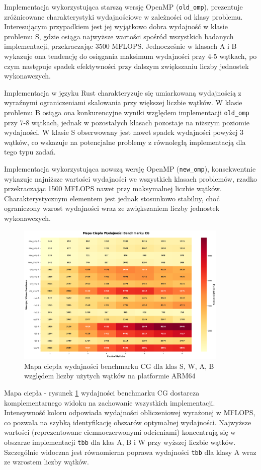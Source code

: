 Implementacja wykorzystująca starszą wersję OpenMP (\texttt{old\_omp}), prezentuje zróżnicowane charakterystyki wydajnościowe w zależności od klasy problemu. Interesującym przypadkiem jest jej wyjątkowo dobra wydajność w klasie problemu S, gdzie osiąga najwyższe wartości spośród wszystkich badanych implementacji, przekraczając 3500 MFLOPS. Jednocześnie w klasach A i B wykazuje ona tendencję do osiągania maksimum wydajności przy 4-5 wątkach, po czym następuje spadek efektywności przy dalszym zwiększaniu liczby jednostek wykonawczych.

Implementacja w języku Rust charakteryzuje się umiarkowaną wydajnością z wyraźnymi ograniczeniami skalowania przy większej liczbie wątków. W klasie problemu B osiąga ona konkurencyjne wyniki względem implementacji \texttt{old\_omp} przy 7-8 wątkach, jednak w pozostałych klasach pozostaje na niższym poziomie wydajności. W klasie S obserwowany jest nawet spadek wydajności powyżej 3 wątków, co wskazuje na potencjalne problemy z równoległą implementacją dla tego typu zadań.

Implementacja wykorzystująca nowszą wersję OpenMP (\texttt{new\_omp}), konsekwentnie wykazuje najniższe wartości wydajności we wszystkich klasach problemów, rzadko przekraczając 1500 MFLOPS nawet przy maksymalnej liczbie wątków. Charakterystycznym elementem jest jednak stosunkowo stabilny, choć ograniczony wzrost wydajności wraz ze zwiększaniem liczby jednostek wykonawczych.

\begin{figure}[H]
    \centering
    \includegraphics[width=0.9\textwidth]{analiza/images/parallel/cg/x86/cg_mapa_ciepla_wydajnosci.png}
    \caption{Mapa ciepła wydajności benchmarku CG dla klas S, W, A, B względem liczby użytych wątków na platformie ARM64}
    \label{cg_heatmap_wydajnosci_x86_64}
\end{figure}
Mapa ciepła - rysunek \ref{cg_heatmap_wydajnosci_x86_64} wydajności benchmarku CG dostarcza komplementarnego widoku na zachowanie wszystkich implementacji. Intensywność koloru odpowiada wydajności obliczeniowej wyrażonej w MFLOPS, co pozwala na szybką identyfikację obszarów optymalnej wydajności. Najwyższe wartości (reprezentowane ciemnoczerwonymi odcieniami) koncentrują się w obszarze implementacji \texttt{tbb} dla klas A, B i W przy wyższej liczbie wątków. Szczególnie widoczna jest równomierna poprawa wydajności \texttt{tbb} dla klasy A wraz ze wzrostem liczby wątków.

